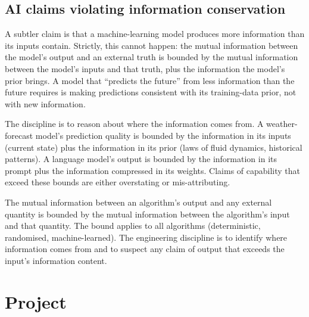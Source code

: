 \subsection{AI claims violating information conservation}

A subtler claim is that a machine-learning model produces more information than its inputs contain. Strictly, this cannot happen: the mutual information between the model's output and an external truth is bounded by the mutual information between the model's inputs and that truth, plus the information the model's prior brings. A model that ``predicts the future'' from less information than the future requires is making predictions consistent with its training-data prior, not with new information.

The discipline is to reason about where the information comes from. A weather-forecast model's prediction quality is bounded by the information in its inputs (current state) plus the information in its prior (laws of fluid dynamics, historical patterns). A language model's output is bounded by the information in its prompt plus the information compressed in its weights. Claims of capability that exceed these bounds are either overstating or mis-attributing.

\begin{principle}
The mutual information between an algorithm's output and any external quantity is bounded by the mutual information between the algorithm's input and that quantity. The bound applies to all algorithms (deterministic, randomised, machine-learned). The engineering discipline is to identify where information comes from and to suspect any claim of output that exceeds the input's information content.
\end{principle}

\section{Project}

